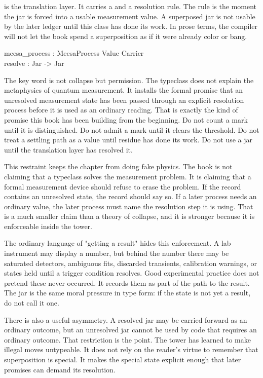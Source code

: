  is the translation layer. It carries a  and a
resolution rule. The rule is the moment the jar is forced into a usable
measurement value. A superposed jar is not usable by the later ledger until
this class has done its work. In prose terms, the compiler will not let the
book spend a superposition as if it were already color or bang.

\begin{leancode}
meesa\_process : MeesaProcess Value Carrier\\
resolve : Jar -> Jar
\end{leancode}

The key word is not collapse but permission. The typeclass does not explain
the metaphysics of quantum measurement. It installs the formal promise that an
unresolved measurement state has been passed through an explicit resolution
process before it is used as an ordinary reading. That is exactly the kind of
promise this book has been building from the beginning. Do not count a mark
until it is distinguished. Do not admit a mark until it clears the threshold.
Do not treat a settling path as a value until residue has done its work. Do not
use a jar until the translation layer has resolved it.

This restraint keeps the chapter from doing fake physics. The book is not
claiming that a typeclass solves the measurement problem. It is claiming that a
formal measurement device should refuse to erase the problem. If the record
contains an unresolved state, the record should say so. If a later process
needs an ordinary value, the later process must name the resolution step it is
using. That is a much smaller claim than a theory of collapse, and it is
stronger because it is enforceable inside the tower.

The ordinary language of "getting a result" hides this enforcement. A lab
instrument may display a number, but behind the number there may be saturated
detectors, ambiguous fits, discarded transients, calibration warnings, or
states held until a trigger condition resolves. Good experimental practice
does not pretend these never occurred. It records them as part of the path to
the result. The jar is the same moral pressure in type form: if the state is
not yet a result, do not call it one.

There is also a useful asymmetry. A resolved jar may be carried forward as an
ordinary outcome, but an unresolved jar cannot be used by code that requires an
ordinary outcome. That restriction is the point. The tower has learned to make
illegal moves untypeable. It does not rely on the reader's virtue to remember
that superposition is special. It makes the special state explicit enough that
later promises can demand its resolution.

